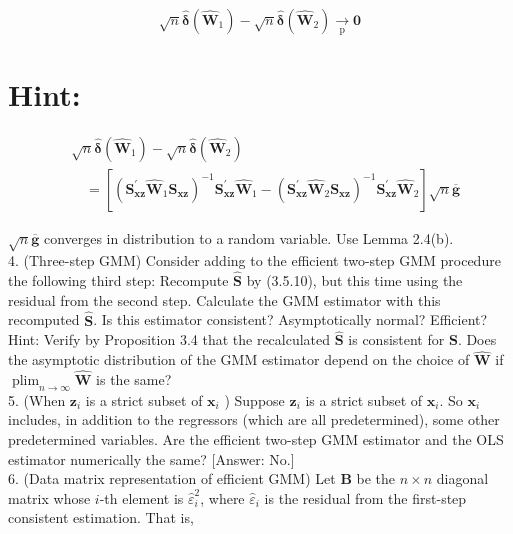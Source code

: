 \documentclass[10pt]{article}
\begin{document}
$$
\sqrt{n} \hat{\boldsymbol{\delta}}\left(\widehat{\mathbf{W}}_{1}\right)-\sqrt{n} \hat{\boldsymbol{\delta}}\left(\widehat{\mathbf{W}}_{2}\right) \underset{\mathrm{p}}{\rightarrow} \mathbf{0}
$$

\section*{Hint:}
$$
\begin{aligned}
& \sqrt{n} \hat{\boldsymbol{\delta}}\left(\widehat{\mathbf{W}}_{1}\right)-\sqrt{n} \hat{\boldsymbol{\delta}}\left(\widehat{\mathbf{W}}_{2}\right) \\
& \quad=\left[\left(\mathbf{S}_{\mathbf{x z}}^{\prime} \widehat{\mathbf{W}}_{1} \mathbf{S}_{\mathbf{x z}}\right)^{-1} \mathbf{S}_{\mathbf{x z}}^{\prime} \widehat{\mathbf{W}}_{1}-\left(\mathbf{S}_{\mathbf{x z}}^{\prime} \widehat{\mathbf{W}}_{2} \mathbf{S}_{\mathbf{x z}}\right)^{-1} \mathbf{S}_{\mathbf{x z}}^{\prime} \widehat{\mathbf{W}}_{2}\right] \sqrt{n} \overline{\mathbf{g}}
\end{aligned}
$$

$\sqrt{n} \overline{\mathbf{g}}$ converges in distribution to a random variable. Use Lemma 2.4(b).\\
4. (Three-step GMM) Consider adding to the efficient two-step GMM procedure the following third step: Recompute $\widehat{\mathbf{S}}$ by (3.5.10), but this time using the residual from the second step. Calculate the GMM estimator with this recomputed $\widehat{\mathbf{S}}$. Is this estimator consistent? Asymptotically normal? Efficient? Hint: Verify by Proposition 3.4 that the recalculated $\widehat{\mathbf{S}}$ is consistent for $\mathbf{S}$. Does the asymptotic distribution of the GMM estimator depend on the choice of $\widehat{\mathbf{W}}$ if $\operatorname{plim}_{n \rightarrow \infty} \widehat{\mathbf{W}}$ is the same?\\
5. (When $\mathbf{z}_{i}$ is a strict subset of $\mathbf{x}_{i}$ ) Suppose $\mathbf{z}_{i}$ is a strict subset of $\mathbf{x}_{i}$. So $\mathbf{x}_{i}$ includes, in addition to the regressors (which are all predetermined), some other predetermined variables. Are the efficient two-step GMM estimator and the OLS estimator numerically the same? [Answer: No.]\\
6. (Data matrix representation of efficient GMM) Let $\mathbf{B}$ be the $n \times n$ diagonal matrix whose $i$-th element is $\hat{\varepsilon}_{i}^{2}$, where $\hat{\varepsilon}_{i}$ is the residual from the first-step consistent estimation. That is,
\end{document}
